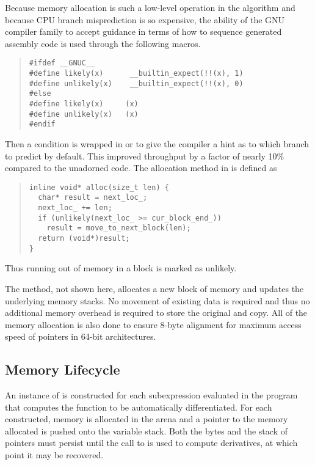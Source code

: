 \documentclass[10pt]{article}
\begin{document}
Because memory allocation is such a low-level operation in the
algorithm and because CPU branch misprediction is so expensive, the
ability of the GNU compiler family to accept guidance in terms of how
to sequence generated assembly code is used through the following
macros.
%
\begin{quote}
\begin{Verbatim}
#ifdef __GNUC__
#define likely(x)      __builtin_expect(!!(x), 1)
#define unlikely(x)    __builtin_expect(!!(x), 0)
#else
#define likely(x)     (x)
#define unlikely(x)   (x)
#endif
\end{Verbatim}
\end{quote}
%
Then a condition is wrapped in  or  to
give the compiler a hint as to which branch to predict by default.
This improved throughput by a factor of nearly 10\% compared to the
unadorned code.    The allocation method in  is
defined as
%
\begin{quote}
\begin{Verbatim}
inline void* alloc(size_t len) {
  char* result = next_loc_;
  next_loc_ += len;
  if (unlikely(next_loc_ >= cur_block_end_))
    result = move_to_next_block(len);
  return (void*)result;
}
\end{Verbatim}
\end{quote}
%
Thus running out of memory in a block is marked as unlikely.  

The  method, not shown here, allocates a
new block of memory and updates the underlying memory stacks.  No
movement of existing data is required and thus no additional memory
overhead is required to store the original and copy.  All of the
memory allocation is also done to ensure 8-byte alignment for maximum
access speed of pointers in 64-bit architectures.

\subsection{Memory Lifecycle}

An instance of  is constructed for each subexpression
evaluated in the program that computes the function to be
automatically differentiated.  For each  constructed,
memory is allocated in the arena and a pointer to the memory allocated
is pushed onto the variable stack.  Both the bytes and the stack of
pointers must persist until the call to  is used to compute
derivatives, at which point it may be recovered.
\end{document}

